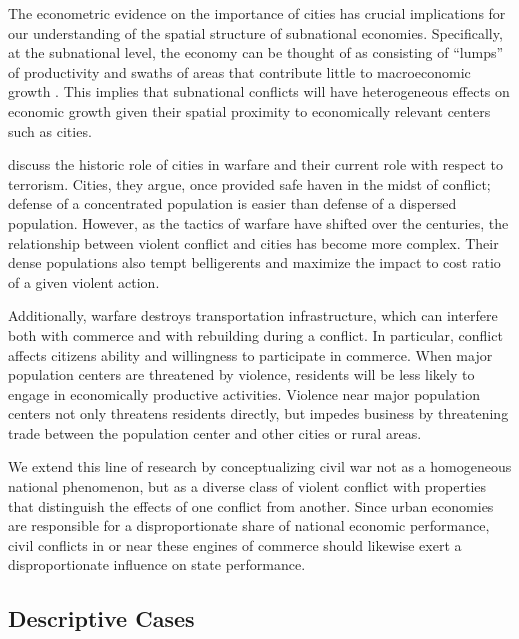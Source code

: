 The econometric evidence on the importance of cities has crucial implications for our understanding of the spatial structure of subnational economies. Specifically, at the subnational level, the economy can be thought of as consisting of ``lumps'' of productivity and swaths of areas that contribute little to macroeconomic growth \citep{venables:2005}. This implies that subnational conflicts will have heterogeneous effects on economic growth given their spatial proximity to economically relevant centers such as cities.

\citet{glaeser:shapiro:2002} discuss the historic role of cities in warfare and their current role with respect to terrorism. Cities, they argue, once provided safe haven in the midst of conflict; defense of a concentrated population is easier than defense of a dispersed population. However, as the tactics of warfare have shifted over the centuries, the relationship between violent conflict and cities has become more complex. Their dense populations also tempt belligerents and maximize the impact to cost ratio of a given violent action. 

Additionally, warfare destroys transportation infrastructure, which can interfere both with commerce and with rebuilding during a conflict. In particular, conflict affects citizens ability and willingness to participate in commerce. When major population centers are threatened by violence, residents will be less likely to engage in economically productive activities. Violence near major population centers not only threatens residents directly, but impedes business by threatening trade between the population center and other cities or rural areas. 

We extend this line of research by conceptualizing civil war not as a homogeneous national phenomenon, but as a diverse class of violent conflict with properties that distinguish the effects of one conflict from another. Since urban economies are responsible for a disproportionate share of national economic performance, civil conflicts in or near these engines of commerce should likewise exert a disproportionate influence on state performance. 

\subsection{Descriptive Cases}

